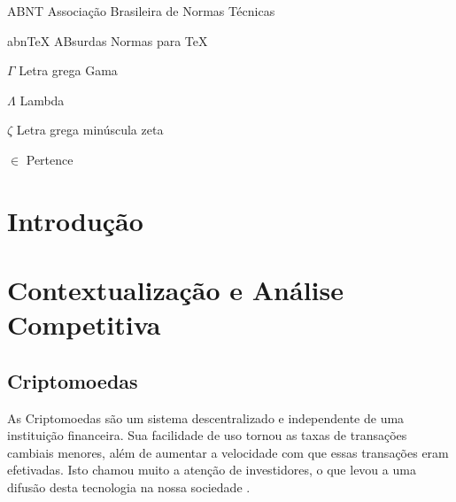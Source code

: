 \documentclass[
	article,			%
	12pt,				%
	openright,			%
	oneside,			%
	a4paper,			%
	chapter=TITLE,		%
	section=TITLE,		%
	subsection=TITLE,	%
	subsubsection=TITLE,%
	subsubsubsection=TITLE, %
	english,			%
	brazil,				%
	]{abntex2}
\begin{document}

\listoffigures*
\cleardoublepage

\listoftables*
\cleardoublepage

\begin{siglas}
  \item[ABNT] Associação Brasileira de Normas Técnicas
  \item[abnTeX] ABsurdas Normas para TeX
\end{siglas}

\begin{simbolos}
  \item[$ \Gamma $] Letra grega Gama
  \item[$ \Lambda $] Lambda
  \item[$ \zeta $] Letra grega minúscula zeta
  \item[$ \in $] Pertence
\end{simbolos}

\tableofcontents*
\cleardoublepage


\textual

\section{Introdução}

\section{Contextualização e Análise Competitiva}

\subsection{Criptomoedas}


As Criptomoedas são um sistema descentralizado e independente de uma
instituição financeira. Sua facilidade de uso tornou as taxas de
transações cambiais menores, além de aumentar a velocidade com que
essas transações eram efetivadas. Isto chamou muito a atenção de
investidores, o que levou a uma difusão desta tecnologia na
nossa sociedade \cite{Nakamoto2008, Prado2017}.
\end{document}
